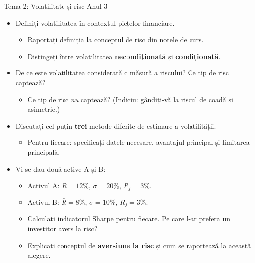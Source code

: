 \documentclass[9pt, aspectratio=169, t]{beamer}
\theoremstyle{definition}
\begin{document}
\begin{frame}{Tema 2: Volatilitate și risc \hfill {\small\textcolor{Forest}{Anul 3}}}
\begin{itemize}
    \item Definiți volatilitatea în contextul piețelor financiare.
    \begin{itemize}
        \item Raportați definiția la conceptul de risc din notele de curs.
        \item Distingeți între volatilitatea \textbf{necondiționată} și \textbf{condiționată}.
    \end{itemize}
    \item De ce este volatilitatea considerată o măsură a riscului? Ce tip de risc captează?
    \begin{itemize}
        \item Ce tip de risc \textit{nu} captează? (Indiciu: gândiți-vă la riscul de coadă și asimetrie.)
    \end{itemize}
    \item Discutați cel puțin \textbf{trei} metode diferite de estimare a volatilității.
    \begin{itemize}
        \item Pentru fiecare: specificați datele necesare, avantajul principal și limitarea principală.
    \end{itemize}
    \item Vi se dau două active A și B:
    \begin{itemize}
        \item Activul A: $\bar{R} = 12\%$, $\sigma = 20\%$, $R_f = 3\%$.
        \item Activul B: $\bar{R} = 8\%$, $\sigma = 10\%$, $R_f = 3\%$.
        \item Calculați indicatorul Sharpe pentru fiecare. Pe care l-ar prefera un investitor avers la risc?
        \item Explicați conceptul de \textbf{aversiune la risc} și cum se raportează la această alegere.
    \end{itemize}
\end{itemize}
\end{frame}
\end{document}
